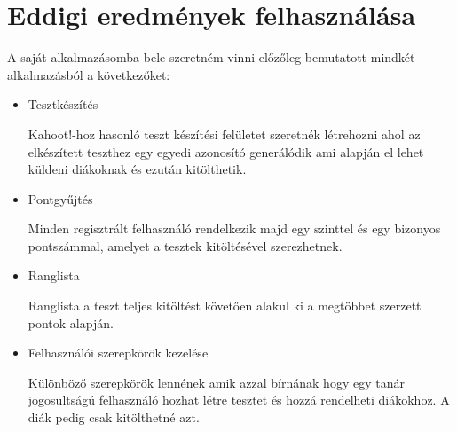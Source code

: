 \section{Eddigi eredmények felhasználása}
A saját alkalmazásomba bele szeretném vinni előzőleg bemutatott mindkét alkalmazásból a következőket:

\begin{itemize}
  \item {Tesztkészítés}
        \begin{addmargin}[\parindent]{0pt}
          Kahoot!-hoz hasonló teszt készítési felületet szeretnék létrehozni ahol az elkészített teszthez egy egyedi azonosító generálódik ami alapján el lehet küldeni diákoknak és ezután kitölthetik.
        \end{addmargin}
  \item {Pontgyűjtés}
        \begin{addmargin}[\parindent]{0pt}
          Minden regisztrált felhasználó rendelkezik majd egy szinttel és egy bizonyos pontszámmal, amelyet a tesztek kitöltésével szerezhetnek.
        \end{addmargin}
  \item {Ranglista}
        \begin{addmargin}[\parindent]{0pt}
          Ranglista a teszt teljes kitöltést követően alakul ki a megtöbbet szerzett pontok alapján.
        \end{addmargin}
  \item {Felhasználói szerepkörök kezelése}
        \begin{addmargin}[\parindent]{0pt}
          Különböző szerepkörök lennének amik azzal bírnának hogy egy tanár jogosultságú felhasználó hozhat létre tesztet és hozzá rendelheti diákokhoz. A diák pedig csak kitölthetné azt.
        \end{addmargin}
\end{itemize}